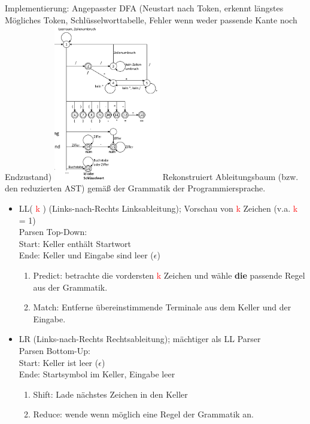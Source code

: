 Implementierung: Angepasster DFA (Neustart nach Token, erkennt längstes Mögliches Token, Schlüsselworttabelle, Fehler wenn weder passende Kante noch Endzustand)
\includegraphics[angle=90,width=0.35\textwidth]{scanner}
\newcommand{\K}{ \textcolor{red}{k} }
Rekonstruiert Ableitungsbaum (bzw. den reduzierten AST) gemäß der Grammatik der Programmiersprache.
\begin{itemize}
\item LL(\K) (Links-nach-Rechts Linksableitung); Vorschau von \K Zeichen (v.a. \K = 1)\\ 
		Parsen Top-Down: \\
		Start: Keller enthält Startwort\\
		Ende: Keller und Eingabe sind leer ($\epsilon$)
	\begin{enumerate}
		\item Predict: betrachte die vordersten \K Zeichen und wähle \textbf{die} passende Regel aus der Grammatik.
		\item Match: Entferne übereinstimmende Terminale aus dem Keller und der Eingabe.
	\end{enumerate}
	
	
\item LR (Links-nach-Rechts Rechtsableitung); mächtiger als LL Parser\\
	Parsen Bottom-Up:\\
		Start: Keller ist leer ($\epsilon$)\\
		Ende: Startsymbol im Keller, Eingabe leer
	\begin{enumerate}
		\item Shift: Lade nächstes Zeichen in den Keller
		\item Reduce: wende wenn möglich eine Regel der Grammatik an.
	\end{enumerate}
		

\end{itemize}


